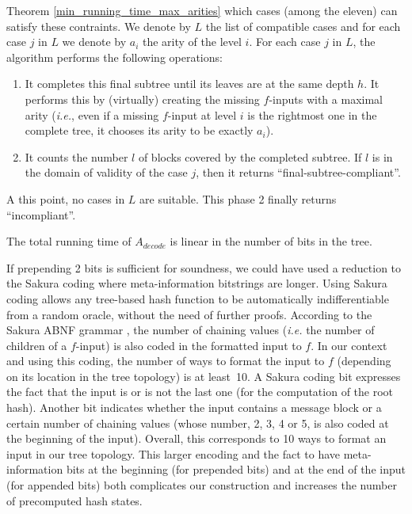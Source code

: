 \documentclass{llncs}
\begin{document}
\begin{enumerate}
\begin{enumerate}
  Theorem \ref{min_running_time_max_arities}
  which cases (among the eleven) can satisfy these contraints. We denote by $L$ the list of compatible cases and for each case $j$ in $L$ we denote by $a_i$ the arity 
  of the level $i$. For each case $j$ in $L$, the algorithm performs the following operations:
  \begin{enumerate}
   \item It completes this final subtree until its leaves are at the same depth $h$. It performs this 
   by (virtually) creating the missing $f$-inputs with a maximal arity (\emph{i.e.}, even if a missing $f$-input at level $i$ is the rightmost one 
   in the complete tree, it chooses its arity to be exactly $a_i$).
   \item It counts the number $l$ of blocks covered by the completed subtree. If $l$ is in the domain of validity of the case $j$, then it returns ``final-subtree-compliant''.
  \end{enumerate}
  A this point, no cases in $L$ are suitable. This phase 2 finally returns ``incompliant''.
 \end{enumerate}


\end{enumerate}

\noindent
The total running time of $A_{decode}$ is linear in the number of bits in the tree.



\begin{remark}If prepending 2 bits is sufficient \cite{BDPV14_Suf} for soundness, we could have used a reduction to the Sakura coding \cite{BDPV14_Sak} 
where meta-information bitstrings are longer. 
Using Sakura coding allows any tree-based hash function
to be automatically indifferentiable from a random oracle, without the need of further proofs.
According to the Sakura ABNF grammar \cite{BDPV14_Sak}, the number of chaining values (\textit{i.e.} the number of children of a $f$-input) 
is also coded in the formatted input to $f$.  
In our context and using this coding, the number of ways to format the input to $f$ (depending on 
its location in the tree topology) is at least~10. A Sakura coding bit 
expresses the fact that 
the input is or is not the last one (for the computation of the root hash). Another bit indicates whether the input contains a message block
or a certain number of chaining values (whose number, 2, 3, 4 or 5, is also coded at the beginning of the input). 
Overall, this corresponds to 10 ways to format an input in our 
tree topology. This larger encoding and the fact to have meta-information bits at the beginning (for prepended bits) 
and at the end of the input (for appended bits) both complicates our construction and increases the number of precomputed hash states.
\end{remark}
\end{document}
